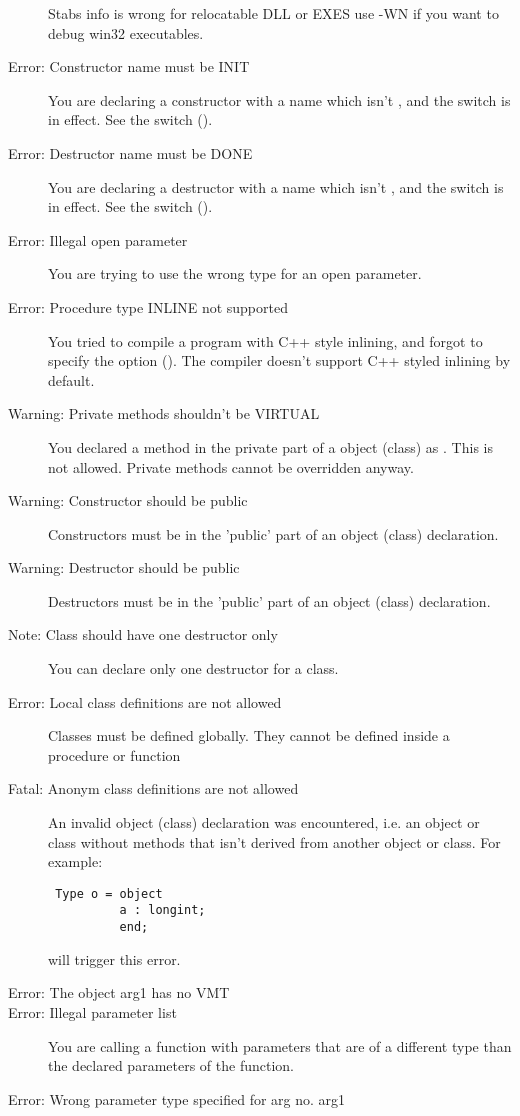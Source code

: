 \begin{description}
 Stabs info is wrong for relocatable DLL or EXES use -WN
 if you want to debug win32 executables.
\item [Error: Constructor name must be INIT]
 You are declaring a constructor with a name which isn't , and the
  switch is in effect. See the  switch ().
\item [Error: Destructor name must be DONE]
 You are declaring a destructor with a name which isn't , and the
  switch is in effect. See the  switch ().
\item [Error: Illegal open parameter]
 You are trying to use the wrong type for an open parameter.
\item [Error: Procedure type INLINE not supported]
 You tried to compile a program with C++ style inlining, and forgot to
 specify the  option (). The compiler doesn't support C++
 styled inlining by default.
\item [Warning: Private methods shouldn't be VIRTUAL]
 You declared a method in the private part of a object (class) as
 . This is not allowed. Private methods cannot be overridden
 anyway.
\item [Warning: Constructor should be public]
 Constructors must be in the 'public' part of an object (class) declaration.
\item [Warning: Destructor should be public]
 Destructors must be in the 'public' part of an object (class) declaration.
\item [Note: Class should have one destructor only]
 You can declare only one destructor for a class.
\item [Error: Local class definitions are not allowed]
 Classes must be defined globally. They cannot be defined inside a
 procedure or function
\item [Fatal: Anonym class definitions are not allowed]
 An invalid object (class) declaration was encountered, i.e. an
 object or class without methods that isn't derived from another object or
 class. For example:
 \begin{verbatim}
 Type o = object
          a : longint;
          end;
 \end{verbatim}
 will trigger this error.
\item [Error: The object arg1 has no VMT]
\item [Error: Illegal parameter list]
 You are calling a function with parameters that are of a different type than
 the declared parameters of the function.
\item [Error: Wrong parameter type specified for arg no. arg1]

\end{description}
